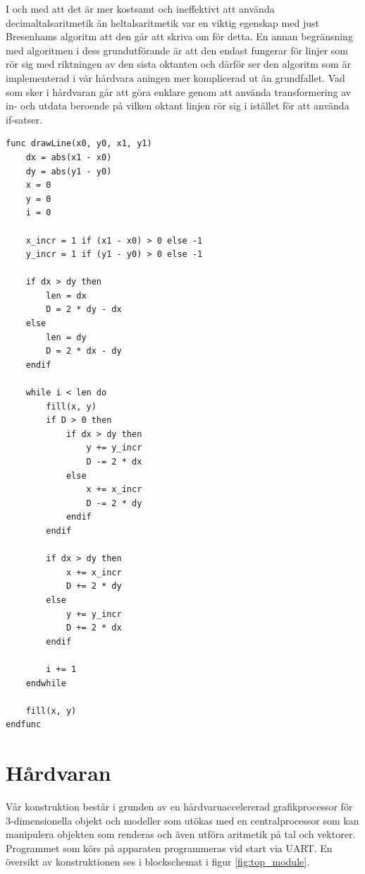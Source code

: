 \documentclass[a4paper]{article}
\begin{document}
    I och med att det är mer kostsamt och ineffektivt att använda
    decimaltalsaritmetik än heltalsaritmetik var en viktig egenskap med just
    Bresenhams algoritm att den går att skriva om för detta. En annan begränsning
    med algoritmen i dess grundutförande är att den endast fungerar för linjer som
    rör sig med riktningen av den sista oktanten och därför ser den algoritm som är
    implementerad i vår hårdvara aningen mer komplicerad ut än grundfallet. Vad som
    sker i hårdvaran går att göra enklare genom att använda transformering av in-
    och utdata beroende på vilken oktant linjen rör sig i istället för att använda
    if-satser. 

    \begin{lstlisting}[]
func drawLine(x0, y0, x1, y1)
    dx = abs(x1 - x0)
    dy = abs(y1 - y0)
    x = 0
    y = 0
    i = 0

    x_incr = 1 if (x1 - x0) > 0 else -1
    y_incr = 1 if (y1 - y0) > 0 else -1
    
    if dx > dy then
        len = dx
        D = 2 * dy - dx
    else
        len = dy
        D = 2 * dx - dy
    endif

    while i < len do
        fill(x, y)
        if D > 0 then
            if dx > dy then
                y += y_incr
                D -= 2 * dx
            else
                x += x_incr
                D -= 2 * dy
            endif
        endif
        
        if dx > dy then
            x += x_incr
            D += 2 * dy
        else
            y += y_incr
            D += 2 * dx
        endif

        i += 1
    endwhile
    
    fill(x, y)
endfunc
    \end{lstlisting}
    




    \section{Hårdvaran}

    Vår konstruktion består i grunden av en hårdvaruaccelererad grafikprocessor
    för 3-dimensionella objekt och modeller som utökas med en centralprocessor
    som kan manipulera objekten som renderas och även utföra aritmetik på tal
    och vektorer. Programmet som körs på apparaten programmeras vid start via
    UART. En översikt av konstruktionen ses i blockschemat i figur
    \ref{fig:top_module}. 
\end{document}
